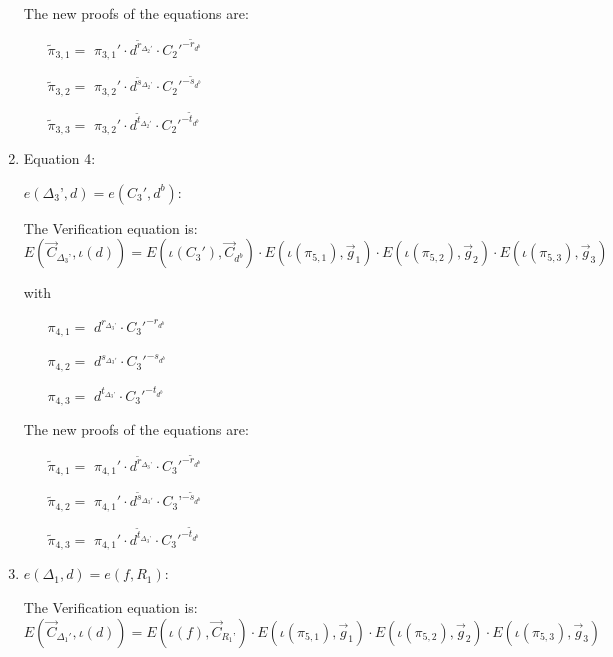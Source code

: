 \begin{description}
\begin{enumerate}
    The new proofs of the equations are:
    
    \begin{itemize}
    \item[$\tilde{\pi}_{3,1} = $] $\pi_{3,1}' \cdot d^{\tilde{r}_{\Delta_2'}} \cdot C_2'^{-\tilde{r}_{d^b}}$ 
    \item[$\tilde{\pi}_{3,2} = $] $\pi_{3,2}' \cdot d^{\tilde{s}_{\Delta_2’}} \cdot C_2'^{-\tilde{s}_{d^b}}$    
    \item[$\tilde{\pi}_{3,3} = $] $\pi_{3,2}' \cdot d^{\tilde{t}_{\Delta_2'}} \cdot C_2'^{-\tilde{t}_{d^b}}$ 
    \end{itemize}

    
  \item Equation 4:

    $e(\boxed{\Delta_3’},d) = e(C_3', \boxed{d^b})$:
    
    The Verification equation is:  $E(\vec{C}_{\Delta_3’}, \iota(d)) = E(\iota(C_3'), \vec{C}_{d^b}) \cdot E(\iota(\pi_{5,1}), \vec{g}_1)\cdot E(\iota(\pi_{5,2}), \vec{g}_2)\cdot E(\iota(\pi_{5,3}), \vec{g}_3)$
    
    with
    \begin{itemize}
    \item[$\pi_{4,1} = $] $d^{r_{\Delta_3’}} \cdot C_3'^{-r_{d^b}}$
    \item[$\pi_{4,2} = $] $d^{s_{\Delta_3'}} \cdot C_3'^{-s_{d^b}}$
    \item[$\pi_{4,3} = $] $d^{t_{\Delta_3’}} \cdot C_3'^{-t_{d^b}}$
    \end{itemize}

    The new proofs of the equations are:

    \begin{itemize}
    \item[$\tilde{\pi}_{4,1} = $] $\pi_{4,1}' \cdot d^{\tilde{r}_{\Delta_3’}} \cdot C_3'^{-\tilde{r}_{d^b}}$
    \item[$\tilde{\pi}_{4,2} = $] $\pi_{4,1}' \cdot d^{\tilde{s}_{\Delta_3'}} \cdot C_3’^{-\tilde{s}_{d^b}}$
    \item[$\tilde{\pi}_{4,3} = $] $\pi_{4,1}' \cdot d^{\tilde{t}_{\Delta_3’}} \cdot C_3'^{-\tilde{t}_{d^b}}$
    \end{itemize}

  \item $e(\boxed{\Delta_1},d) = e(f, \boxed{R_1})$:
    
    The Verification equation is:  $E(\vec{C}_{\Delta_1'}, \iota(d)) = E(\iota(f), \vec{C}_{R_1’}) \cdot E(\iota(\pi_{5,1}), \vec{g}_1)\cdot E(\iota(\pi_{5,2}), \vec{g}_2)\cdot E(\iota(\pi_{5,3}), \vec{g}_3)$
    

\end{enumerate}
\end{description}
